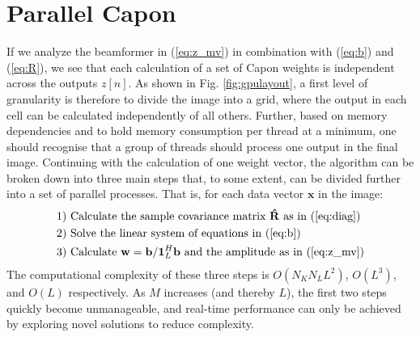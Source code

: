 \documentclass[12pt,journal,onecolumn]{IEEEtran}
\newcommand{\mat}[1]{\mathbf{#1}}
\renewcommand{\vec}[1]{\mathbf{#1}}
\begin{document}
\section{Parallel Capon}\label{sec:meth}
If we analyze the beamformer in (\ref{eq:z_mv}) in combination with (\ref{eq:b}) and (\ref{eq:R}), we see that each calculation of a set of Capon weights is independent across the outputs $z[n]$. As shown in Fig. \ref{fig:gpulayout}, a first level of granularity is therefore to divide the image into a grid, where the output in each cell can be calculated independently of all others. Further, based on memory dependencies and to hold memory consumption per thread at a minimum, one should recognise that a group of threads should process one output in the final image. Continuing with the calculation of one weight vector, the algorithm can be broken down into three main steps that, to some extent, can be divided further into a set of parallel processes. That is, for each data vector $\vec{x}$ in the image:
\begin{align*}
\text{1) } &\text{Calculate the sample covariance matrix } \mat{\hat{R}} \text{ as in } \text{(\ref{eq:diag})}\\
\text{2) } &\text{Solve the linear system of equations in (\ref{eq:b}})\\ %
\text{3) } &\text{Calculate } \vec{w} = \vec{b}/\vec{1}_{L}^H\vec{b} \text{ and the amplitude as in (\ref{eq:z_mv})}
\end{align*}
The computational complexity of these three steps is $O(N_KN_LL^2)$, $O(L^3)$, and $O(L)$ respectively. As $M$ increases (and thereby $L$), the first two steps quickly become unmanageable, and real-time performance can only be achieved by exploring novel solutions to reduce complexity. 
\end{document}
